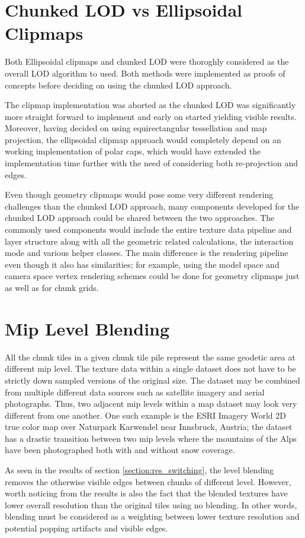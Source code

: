 \section{Chunked LOD vs Ellipsoidal Clipmaps}
Both Ellipsoidal clipmaps and chunked LOD were thoroghly considered as the overall LOD algorithm to used. Both methods were implemented as proofs of concepts before deciding on using the chunked LOD approach.

The clipmap implementation was aborted as the chunked LOD was significantly more straight forward to implement and early on started yielding visible results. Moreover, having decided on using equirectangular tessellation and map projection, the ellipsoidal clipmap approach would completely depend on an working implementation of polar caps, which would have extended the implementation time further with the need of considering both re-projection and edges.

Even though geometry clipmaps would pose some very different rendering challenges than the chunked LOD approach, many components developed for the chunked LOD approach could be shared between the two approaches.
The commonly used components would include the entire texture data pipeline and layer structure along with all the geometric related calculations, the interaction mode and various helper classes. The main difference is the rendering pipeline even though it also has similarities; for example, using the model space and camera space vertex rendering schemes could be done for geometry clipmaps just as well as for chunk grids.

\section{Mip Level Blending}
All the chunk tiles in a given chunk tile pile represent the same geodetic area at different mip level. 
The texture data within a single dataset does not have to be strictly down sampled versions of the original size. 
The dataset may be combined from multiple different data sources such as satellite imagery and aerial photographs. 
Thus, two adjacent mip levels within a map dataset may look very different from one another. 
One such example is the ESRI Imagery World 2D true color map over Naturpark Karwendel near Innsbruck, Austria; the dataset has a drastic transition between two mip levels where the mountains of the Alps have been photographed both with and without snow coverage.

As seen in the results of section \ref{section:res_switching}, the level blending removes the otherwise visible edges between chunks of different level. However, worth noticing from the results is also the fact that the blended textures have lower overall resolution than the original tiles using no blending. In other words, blending must be considered as a weighting between lower texture resolution and potential popping artifacts and visible edges. 

